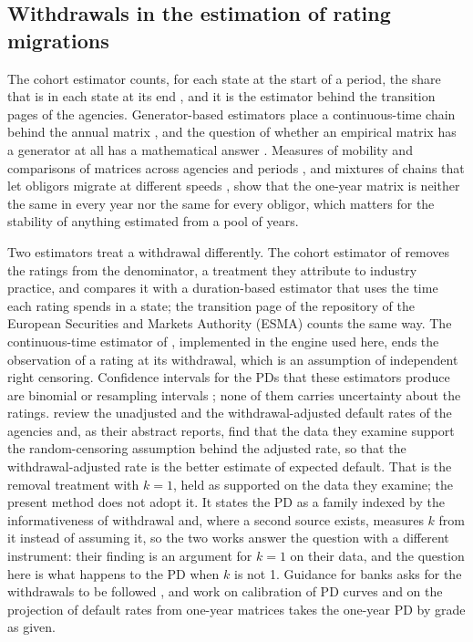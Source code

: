 \subsection{Withdrawals in the estimation of rating migrations}

The cohort estimator counts, for each state at the start of a period, the share that is in each state at its end \citep{anderson1957}, and it is the estimator behind the transition pages of the agencies. Generator-based estimators place a continuous-time chain behind the annual matrix \citep{jarrow1997}, and the question of whether an empirical matrix has a generator at all has a mathematical answer \citep{israel2001}. Measures of mobility and comparisons of matrices across agencies and periods \citep{jafry2004}, and mixtures of chains that let obligors migrate at different speeds \citep{frydman2008}, show that the one-year matrix is neither the same in every year nor the same for every obligor, which matters for the stability of anything estimated from a pool of years.

Two estimators treat a withdrawal differently. The cohort estimator of \citet{schuermann2004} removes the \wdn{} ratings from the denominator, a treatment they attribute to industry practice, and compares it with a duration-based estimator that uses the time each rating spends in a state; the transition page of the repository of the European Securities and Markets Authority (ESMA) counts the same way. The continuous-time estimator of \citet{lando2002}, implemented in the engine used here, ends the observation of a rating at its withdrawal, which is an assumption of independent right censoring. Confidence intervals for the PDs that these estimators produce are binomial or resampling intervals \citep{schuermann2004,hanson2006}; none of them carries uncertainty about the \wdn{} ratings. \citet{cantor2007} review the unadjusted and the withdrawal-adjusted default rates of the agencies and, as their abstract reports, find that the data they examine support the random-censoring assumption behind the adjusted rate, so that the withdrawal-adjusted rate is the better estimate of expected default. That is the removal treatment with $k=1$, held as supported on the data they examine; the present method does not adopt it. It states the PD as a family indexed by the informativeness of withdrawal and, where a second source exists, measures $k$ from it instead of assuming it, so the two works answer the question with a different instrument: their finding is an argument for $k=1$ on their data, and the question here is what happens to the PD when $k$ is not 1. Guidance for banks asks for the withdrawals to be followed \citep{eba2017}, and work on calibration of PD curves \citep{tasche2013} and on the projection of default rates from one-year matrices \citep{engelmann2024} takes the one-year PD by grade as given.

